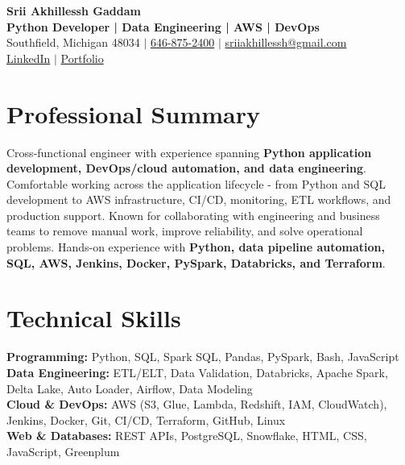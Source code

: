 \documentclass[letterpaper,10pt]{article}
\begin{document}
\fontsize{9.35pt}{10.45pt}\selectfont

\begin{center}
    {\LARGE \textbf{Srii Akhillessh Gaddam}} \\[-1pt]
    \textbf{Python Developer | Data Engineering | AWS | DevOps} \\[2pt]
    Southfield, Michigan 48034 $|$
    \href{tel:6468752400}{646-875-2400} $|$
    \href{mailto:sriiakhillessh@gmail.com}{sriiakhillessh@gmail.com} \\[1pt]
    \href{https://www.linkedin.com/in/srii-akhiilessh-gaddam-b48668191/}{LinkedIn} $|$
    \href{https://sriiakhillesshg.github.io/portfolio/}{Portfolio}
\end{center}
\vspace{-8pt}

\section{Professional Summary}
\small{Cross-functional engineer with experience spanning \textbf{Python application development, DevOps/cloud automation, and data engineering}. Comfortable working across the application lifecycle - from Python and SQL development to AWS infrastructure, CI/CD, monitoring, ETL workflows, and production support. Known for collaborating with engineering and business teams to remove manual work, improve reliability, and solve operational problems. Hands-on experience with \textbf{Python, data pipeline automation, SQL, AWS, Jenkins, Docker, PySpark, Databricks, and Terraform}.}

\section{Technical Skills}
\small{
\textbf{Programming:} Python, SQL, Spark SQL, Pandas, PySpark, Bash, JavaScript \\
\textbf{Data Engineering:} ETL/ELT, Data Validation, Databricks, Apache Spark, Delta Lake, Auto Loader, Airflow, Data Modeling \\
\textbf{Cloud \& DevOps:} AWS (S3, Glue, Lambda, Redshift, IAM, CloudWatch), Jenkins, Docker, Git, CI/CD, Terraform, GitHub, Linux \\
\textbf{Web \& Databases:} REST APIs, PostgreSQL, Snowflake, HTML, CSS, JavaScript, Greenplum
}
\end{document}
